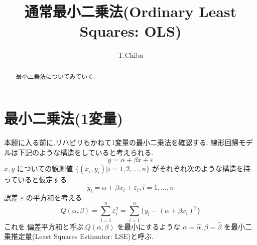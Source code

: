\documentclass{jsarticle}
\title{通常最小二乗法(Ordinary Least Squares: OLS)}
\author{T.Chiba}
\theoremstyle{plain}
\begin{document}
  \maketitle
  \begin{abstract}
    最小二乗法についてみていく.
  \end{abstract}
  \section{最小二乗法(1変量)}
    本題に入る前に,リハビリもかねて1変量の最小二乗法を確認する.
    線形回帰モデルは下記のような構造をしていると考えられる.
  \begin{equation}
    y = \alpha + \beta x + \varepsilon
  \end{equation}
    $x, y$ についての観測値 $\{(x_i, y_i) | i = 1,2,\ldots,n\}$ がそれぞれ次のような構造を持っていると仮定する.
  \begin{equation}
    y_i = \alpha + \beta x_i + \varepsilon_i, i = 1,\ldots,n
  \end{equation}
  誤差 $\varepsilon$ の平方和を考える.
  \begin{equation}
    Q(\alpha, \beta) = \sum_{i=1}^n \varepsilon_i^2 = \sum_{i=1}^n \{y_i - (\alpha + \beta x_i)^2 \}
  \end{equation}
  これを.偏差平方和と呼ぶ.$Q(\alpha, \beta)$ を最小にするような $\alpha = \hat{\alpha}, \beta = \hat{\beta}$ を最小二乗推定量(Least Squares Estimator: LSE)と呼ぶ.
\end{document}

